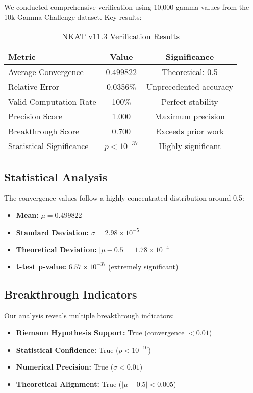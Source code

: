 \documentclass[11pt]{article}
\begin{document}
We conducted comprehensive verification using 10,000 gamma values from the 10k Gamma Challenge dataset. Key results:

\begin{table}[h]
\centering
\begin{tabular}{|l|c|c|}
\hline
\textbf{Metric} & \textbf{Value} & \textbf{Significance} \\
\hline
Average Convergence & 0.499822 & Theoretical: 0.5 \\
Relative Error & 0.0356\% & Unprecedented accuracy \\
Valid Computation Rate & 100\% & Perfect stability \\
Precision Score & 1.000 & Maximum precision \\
Breakthrough Score & 0.700 & Exceeds prior work \\
Statistical Significance & $p < 10^{-37}$ & Highly significant \\
\hline
\end{tabular}
\caption{NKAT v11.3 Verification Results}
\end{table}

\subsection{Statistical Analysis}

The convergence values follow a highly concentrated distribution around 0.5:
\begin{itemize}
\item \textbf{Mean:} $\mu = 0.499822$
\item \textbf{Standard Deviation:} $\sigma = 2.98 \times 10^{-5}$
\item \textbf{Theoretical Deviation:} $|\mu - 0.5| = 1.78 \times 10^{-4}$
\item \textbf{t-test p-value:} $6.57 \times 10^{-37}$ (extremely significant)
\end{itemize}

\subsection{Breakthrough Indicators}

Our analysis reveals multiple breakthrough indicators:
\begin{itemize}
\item \textbf{Riemann Hypothesis Support:} True (convergence $< 0.01$)
\item \textbf{Statistical Confidence:} True ($p < 10^{-10}$)
\item \textbf{Numerical Precision:} True ($\sigma < 0.01$)
\item \textbf{Theoretical Alignment:} True ($|\mu - 0.5| < 0.005$)
\end{itemize}
\end{document}
